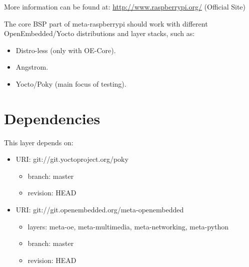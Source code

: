 \documentclass[letterpaper,10pt,english]{sphinxmanual}
\begin{document}
More information can be found at: \href{http://www.raspberrypi.org/}{http://www.raspberrypi.org/} (Official Site)

The core BSP part of meta-raspberrypi should work with different
OpenEmbedded/Yocto distributions and layer stacks, such as:
\begin{itemize}
\item {} 
Distro-less (only with OE-Core).

\item {} 
Angstrom.

\item {} 
Yocto/Poky (main focus of testing).

\end{itemize}


\section{Dependencies}
\label{readme:dependencies}
This layer depends on:
\begin{itemize}
\item {} 
URI: git://git.yoctoproject.org/poky
\begin{itemize}
\item {} 
branch: master

\item {} 
revision: HEAD

\end{itemize}

\item {} 
URI: git://git.openembedded.org/meta-openembedded
\begin{itemize}
\item {} 
layers: meta-oe, meta-multimedia, meta-networking, meta-python

\item {} 
branch: master

\item {} 
revision: HEAD

\end{itemize}

\end{itemize}
\end{document}
